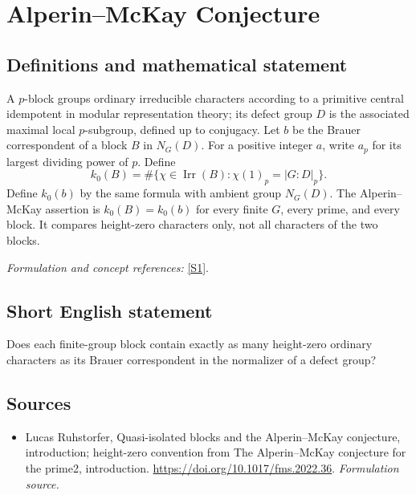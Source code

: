 \documentclass[11pt]{article}
\begin{document}
\section*{\texorpdfstring{Alperin–McKay Conjecture}{Alperin–McKay Conjecture}}\label{278}
\subsection{Definitions and mathematical statement}
A $p$-block groups ordinary irreducible characters according to a primitive central idempotent in modular representation theory; its defect group $D$ is the associated maximal local $p$-subgroup, defined up to conjugacy. Let $b$ be the Brauer correspondent of a block $B$ in $N_G(D)$. For a positive integer $a$, write $a_p$ for its largest dividing power of $p$. Define
\[
 k_0(B)=\#\{\chi\in\operatorname{Irr}(B):\chi(1)_p=|G:D|_p\}.
\]
Define $k_0(b)$ by the same formula with ambient group $N_G(D)$. The Alperin--McKay assertion is $k_0(B)=k_0(b)$ for every finite $G$, every prime, and every block. It compares height-zero characters only, not all characters of the two blocks.
\par\smallskip\textit{Formulation and concept references:} \href{https://doi.org/10.1017/fms.2022.36}{[S1]}.

\subsection{Short English statement}
Does each finite-group block contain exactly as many height-zero ordinary characters as its Brauer correspondent in the normalizer of a defect group?
\subsection{Sources}
\begin{itemize}
\item[S1]Lucas Ruhstorfer, Quasi-isolated blocks and the Alperin–McKay conjecture, introduction; height-zero convention from The Alperin–McKay conjecture for the prime2, introduction.
\url{https://doi.org/10.1017/fms.2022.36}.
\textit{Formulation source.}
\end{itemize}
\end{document}
